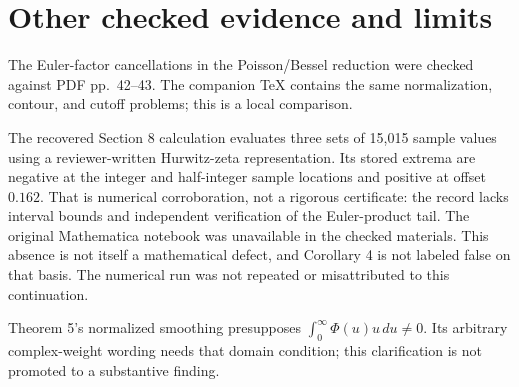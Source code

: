 \documentclass[10pt]{article}
\begin{document}
\section*{Other checked evidence and limits}
The Euler-factor cancellations in the Poisson/Bessel reduction were checked against PDF pp. 42–43. The companion TeX contains the same normalization, contour, and cutoff problems; this is a local comparison.\par
The recovered Section 8 calculation evaluates three sets of 15,015 sample values using a reviewer-written Hurwitz-zeta representation. Its stored extrema are negative at the integer and half-integer sample locations and positive at offset \(0.162\). That is numerical corroboration, not a rigorous certificate: the record lacks interval bounds and independent verification of the Euler-product tail. The original Mathematica notebook was unavailable in the checked materials. This absence is not itself a mathematical defect, and Corollary 4 is not labeled false on that basis. The numerical run was not repeated or misattributed to this continuation.\par
Theorem 5’s normalized smoothing presupposes \(\int_0^\infty\Phi(u)u\,du\ne0\). Its arbitrary complex-weight wording needs that domain condition; this clarification is not promoted to a substantive finding.\par
\end{document}
